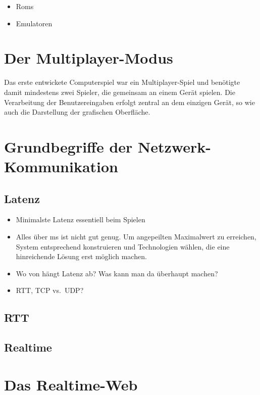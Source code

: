 \begin{itemize}
\tightlist
\item
  Roms
\item
  Emulatoren
\end{itemize}

\section{Der Multiplayer-Modus}\label{der-multiplayer-modus}

Das erste entwickete Computerspiel war ein Multiplayer-Spiel und
benötigte damit mindestens zwei Spieler, die gemeinsam an einem Gerät
spielen. Die Verarbeitung der Benutzereingaben erfolgt zentral an dem
einzigen Gerät, so wie auch die Darstellung der grafischen Oberfläche.

\section{Grundbegriffe der
Netzwerk-Kommunikation}\label{grundbegriffe-der-netzwerk-kommunikation}

\subsection{Latenz}\label{latenz}

\begin{itemize}
\tightlist
\item
  Minimalste Latenz essentiell beim Spielen
\item
  Alles über \unit[N]{ms} ist nicht gut genug. Um angepeilten
  Maximalwert zu erreichen, System entsprechend konstruieren und
  Technologien wählen, die eine hinreichende Lösung erst möglich machen.
\item
  Wo von hängt Latenz ab? Was kann man da überhaupt machen?
\item
  RTT, TCP vs.~UDP?
\end{itemize}

\subsection{RTT}\label{rtt}

\subsection{Realtime}\label{realtime}

\section{Das Realtime-Web}\label{das-realtime-web}

